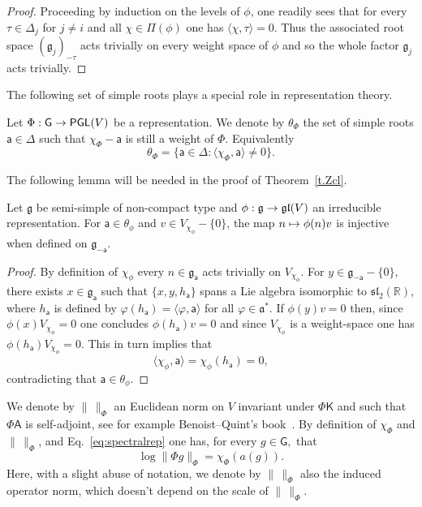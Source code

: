 \documentclass[AHL,Unicode,longabstracts,MathTools]{cedram}
\newcommand{\cartan}{a}
\DeclareMathOperator{\PGL}{{\mathsf{PGL}}}
\renewcommand{\sf}[1]{{\mathsf{#1}}}
\newcommand{\sroot}{{\sf{a}}}
\newcommand{\sfG}{\sf{G}}
\newcommand{\poids}{\sf{\Pi}}
\newcommand{\R}{\mathbb{R}}
\renewcommand{\t}{\theta}
\newcommand{\simple}{{\sf \Delta}}
\newcommand{\Fund}{\Phi}
\newcommand{\slroot}{{\tau}}
\renewcommand{\/}{\backslash}
\newcommand{\<}{\langle}
\renewcommand{\>}{\rangle}
\renewcommand{\ge}{\mathfrak{g}}
\renewcommand{\a}{\mathfrak{a}}
\newcommand{\fksl}{\mathfrak{sl}}
\renewcommand{\sl}{\fksl}
\newcommand{\fkgl}{\mathfrak{gl}}
\renewcommand*{\to}{\mathchoice{\longrightarrow}{\rightarrow}{\rightarrow}{\rightarrow}}
\let\oldmapsto\mapsto
\renewcommand*{\mapsto}{\mathchoice{\longmapsto}{\oldmapsto}{\oldmapsto}{\oldmapsto}}
\begin{document}
\begin{proof}
Proceeding by induction on the levels of $\phi$, one readily sees that for every $\slroot\in\simple_j$ for $j\neq i$ and all $\chi\in\poids(\phi)$ one has $\<\chi,\slroot\>=0$. Thus the associated root space $(\ge_j)_{-\slroot}$ acts trivially on every weight space of $\phi$ and so the whole factor $\ge_j$ acts trivially.
\end{proof}

The following set of simple roots plays a special role in representation theory.


\begin{defi}\label{trep}
Let $\Fund:\sfG\to\PGL(V)$ be a representation. We denote by $\t_\Fund$ the set of simple roots $\sroot\in\simple$ such that $\chi_\Fund-\sroot$ is still a weight of $\Fund$. Equivalently
\begin{equation}\label{peso<}
\t_\Fund=\bigl\{\sroot\in\simple:\<\chi_\Fund,\sroot\>\neq0
\bigr\}.
\end{equation}
\end{defi}


The following lemma will be needed in the proof of Theorem~\ref{t.Zcl}.

\begin{lemm}\label{not}
Let $\ge$ be semi-simple of non-compact type and $\phi:\ge\to\fkgl(V)$ an irreducible representation. For $\sroot\in\t_\phi$ and $v\in V_{\chi_\phi}-\{0\}$, the map $n\mapsto \phi(n)v$ is injective when defined on $\ge_{-\sroot}$.
\end{lemm}


\begin{proof}
By definition of $\chi_\phi$ every $n\in\ge_{\sroot}$ acts trivially on $V_{\chi_\phi}$. For $y\in\ge_{-\sroot}-\{0\}$, there exists $x\in\ge_\sroot$ such that $\{x,y,h_\sroot\}$ spans a Lie algebra isomorphic to $\sl_2(\R)$, where $h_\sroot$ is defined by $\varphi(h_\sroot)=\<\varphi,\sroot\>$ for all $\varphi\in\a^*$. If $\phi(y)v=0$ then, since $\phi(x)V_{\chi_\phi}=0$ one concludes $\phi(h_\sroot)v=0$ and since $V_{\chi_\phi}$ is a weight-space one has $\phi(h_\sroot)V_{\chi_\phi}=0$. This in turn implies that
\[
\<\chi_\phi,\sroot\>=\chi_\phi(h_\sroot)=0,
\]
contradicting that $\sroot\in\t_\phi$.
\end{proof}


We denote by $\|\,\|_\Fund$ an Euclidean norm on $V$ invariant under $\Fund \sf K$ and such that $\Fund\sf A $ is self-adjoint, see for example Benoist--Quint's book~\cite[Lemma~6.33]{BQLibro}. By definition of $\chi_\Fund$ and $\|\,\|_\Fund$, and Eq.~\eqref{eq:spectralrep} one has, for every $g\in \sfG, $ that
\begin{equation}\label{eq:normayrep}
\log\|\Fund g\|_\Fund=\chi_\Fund(\cartan(g)).
\end{equation}
Here, with a slight abuse of notation, we denote by $\|\,\|_\Fund$ also the induced operator norm, which doesn't depend on the scale of $\|\,\|_\Fund$.
\end{document}

